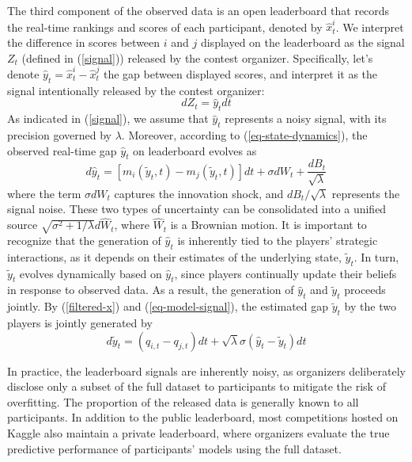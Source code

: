 \documentclass[mnsc]{informs3}
\begin{document}
The third component of the observed data is an open leaderboard that records the real-time rankings and scores of each participant, denoted by $\hat{x}^i_t$. 
We interpret the difference in scores between $i$ and $j$ displayed on the leaderboard as the signal $Z_t$ (defined in (\ref{signal})) released by the contest organizer. 
Specifically, let's denote $\hat{y}_t = \hat{x}^i_t - \hat{x}^j_t$ the gap between displayed scores, and interpret it as the signal intentionally released by the contest organizer: 
\begin{equation}\label{eq-model-signal}
dZ_t = \hat{y}_tdt
\end{equation}
As indicated in (\ref{signal}), we assume that $\hat{y}_t$ represents a noisy signal, with its precision governed by $\lambda$.
Moreover, according to (\ref{eq-state-dynamics}), the observed real-time gap $\hat{y}_t$ on leaderboard evolves as 
\begin{equation}\label{eq-leaderboard-gap}
d\hat{y}_t = \left[m_i(\tilde{y}_t, t) - m_j(\tilde{y}_t, t)\right]dt + \sigma dW_{t} + \frac{dB_t}{\sqrt{\lambda}}
\end{equation}
where the term $\sigma dW_t$ captures the innovation shock, and $dB_t/\sqrt{\lambda}$ represents the signal noise.
These two types of uncertainty can be consolidated into a unified source $\sqrt{\sigma^2 + 1/\lambda}d\hat{W}_t$, where $\hat{W}_t$ is a Brownian motion. 
It is important to recognize that the generation of $\hat{y}_t$ is inherently tied to the players’ strategic interactions, as it depends on their estimates of the underlying state, $\tilde{y}_t$. 
In turn, $\tilde{y}_t$ evolves dynamically based on $\hat{y}_t$, since players continually update their beliefs in response to observed data. 
As a result, the generation of $\hat{y}_t$ and $\tilde{y}_t$ proceeds jointly.
By (\ref{filtered-x}) and (\ref{eq-model-signal}), the estimated gap $\tilde{y}_t$ by the two players is jointly generated by 
\begin{equation}\label{eq-fintered-y-update}
d\tilde{y}_{t} = (q_{i,t}-q_{j,t})dt + \sqrt{\lambda}\sigma(\hat{y}_t-\tilde{y}_{t}) dt
\end{equation}

In practice, the leaderboard signals are inherently noisy, as organizers deliberately disclose only a subset of the full dataset to participants to mitigate the risk of overfitting. 
The proportion of the released data is generally known to all participants.
In addition to the public leaderboard, most competitions hosted on Kaggle also maintain a private leaderboard, where organizers evaluate the true predictive performance of participants’ models using the full dataset.
\end{document}
